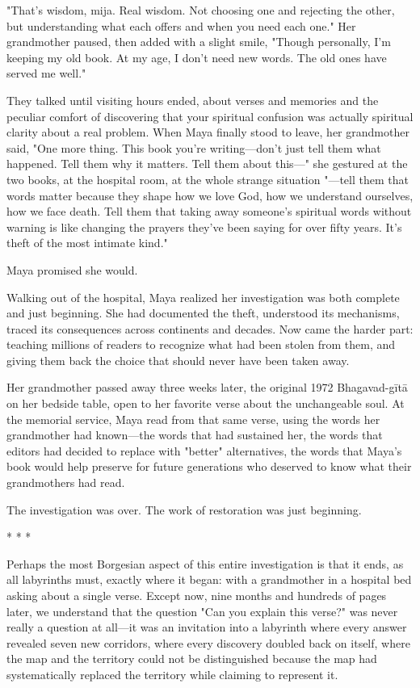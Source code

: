 \documentclass[12pt,twoside]{book}
\begin{document}
"That's wisdom, mija. Real wisdom. Not choosing one and rejecting the other, but understanding what each offers and when you need each one." Her grandmother paused, then added with a slight smile, "Though personally, I'm keeping my old book. At my age, I don't need new words. The old ones have served me well."

They talked until visiting hours ended, about verses and memories and the peculiar comfort of discovering that your spiritual confusion was actually spiritual clarity about a real problem. When Maya finally stood to leave, her grandmother said, "One more thing. This book you're writing—don't just tell them what happened. Tell them why it matters. Tell them about this—" she gestured at the two books, at the hospital room, at the whole strange situation "—tell them that words matter because they shape how we love God, how we understand ourselves, how we face death. Tell them that taking away someone's spiritual words without warning is like changing the prayers they've been saying for over fifty years. It's theft of the most intimate kind."

Maya promised she would.

Walking out of the hospital, Maya realized her investigation was both complete and just beginning. She had documented the theft, understood its mechanisms, traced its consequences across continents and decades. Now came the harder part: teaching millions of readers to recognize what had been stolen from them, and giving them back the choice that should never have been taken away.

Her grandmother passed away three weeks later, the original 1972 Bhagavad-gītā on her bedside table, open to her favorite verse about the unchangeable soul. At the memorial service, Maya read from that same verse, using the words her grandmother had known—the words that had sustained her, the words that editors had decided to replace with "better" alternatives, the words that Maya's book would help preserve for future generations who deserved to know what their grandmothers had read.

The investigation was over. The work of restoration was just beginning.

\begin{center}
* * *
\end{center}

Perhaps the most Borgesian aspect of this entire investigation is that it ends, as all labyrinths must, exactly where it began: with a grandmother in a hospital bed asking about a single verse. Except now, nine months and hundreds of pages later, we understand that the question "Can you explain this verse?" was never really a question at all—it was an invitation into a labyrinth where every answer revealed seven new corridors, where every discovery doubled back on itself, where the map and the territory could not be distinguished because the map had systematically replaced the territory while claiming to represent it.
\end{document}

